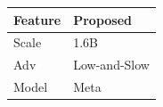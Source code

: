 \begin{tabular}{ll}
\toprule
Feature & Proposed \\
\midrule
Scale & 1.6B \\
Adv & Low-and-Slow \\
Model & Meta \\
\bottomrule
\end{tabular}
